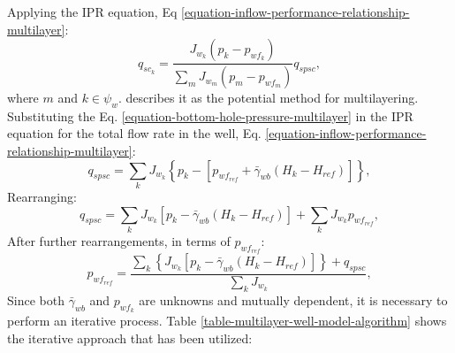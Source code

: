 %
Applying the IPR equation, Eq \ref{equation-inflow-performance-relationship-multilayer}:
%
\begin{equation}
	\label{equation-well-flow-rate}
	q_{sc_k} = \frac{J_{w_k} (p_k- p_{wf_k})}{\sum_{m}J_{w_m} (p_m- p_{wf_m})} q_{spsc},
\end{equation}
where $m$ and $k \in \psi_w$.
%
\cite{Ertekin2001} describes it as the potential method for multilayering.
%
Substituting the Eq. \ref{equation-bottom-hole-pressure-multilayer} in the IPR equation for the total flow rate in the well, Eq. \ref{equation-inflow-performance-relationship-multilayer}:
%
\begin{equation}
	q_{spsc} = \sum_{k} J_{w_k} \left\lbrace p_k - \left[ p_{wf_{ref}} + \bar{\gamma}_{wb} \left( H_k - H_{ref} \right)  \right]  \right\rbrace,
\end{equation}
%
Rearranging:
%
\begin{equation}
	q_{spsc} = \sum_{k} J_{w_k} \left[  p_k - \bar{\gamma}_{wb} \left( H_k - H_{ref} \right) \right] + \sum_{k} J_{w_k} p_{wf_{ref}},
\end{equation}
%
After further rearrangements, in terms of $p_{wf_{ref}}$:
%
\begin{equation}
	\label{equation-bottom-hole-pressure-multilayer-rearranged}
	p_{wf_{ref}} = \frac{\sum_{k} \left\lbrace J_{w_k} \left[ p_k - \bar{\gamma}_{wb} (H_k - H_{ref})\right] \right\rbrace + q_{spsc}}{\sum_{k}J_{w_k}},
\end{equation}
%
Since both $\bar{\gamma}_{wb}$ and $p_{wf_{k}}$ are unknowns and mutually dependent, it is necessary to perform an iterative process.
%
Table \ref{table-multilayer-well-model-algorithm} shows the iterative approach that has been utilized:


